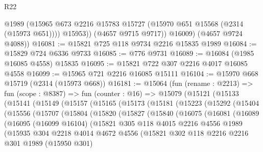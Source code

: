\begin{lexlean}{R22}
\begin{coremodule}
              @1989
              (@15965 @673 @2216 @15783 @15727 (@15970 @651 @15568 (@2314 (@15973 @651))))
              @15953))
          (@4657 @9715 @9717))
        @16009)
      (@4657 @9724 @4088))
@16081 := @15821 @725 @118 @9734 @2216 @15835 @1989
@16084 := @15829 @724 @6336 @9733
@16085 := @776 @9731
@16089 := @16084 (@1985 @16085 @4558) @15835
@16095 := @15821 @722 @307 @2216 @4017 @16085 @4558
@16099 := @15965 @721 @2216 @16085 @15111
@16104 := @15970 @668 @15719 (@2314 (@15973 @668))
@16181 := @15064
    (fun (rename : @2213) =>
    fun (scope : @8387) =>
    fun (counter : @16) =>
    @15079
      (@15121
        (@15133
          (@15141
            (@15149
              (@15157
                (@15165
                  (@15173
                    (@15181
                      (@15223
                        (@15292
                          (@15404
                            (@15556
                              (@15707
                                (@15804
                                  (@15820
                                    (@15827
                                      (@15840
                                        (@16075
                                          (@16081
                                            (@16089
                                              (@16095
                                                (@16099 @16104)
                                                (@15821
                                                  @305
                                                  @118
                                                  @4015
                                                  @2216
                                                  @4556
                                                  @1989
                                                  (@15935
                                                    @304
                                                    @2218
                                                    @4014
                                                    @4672
                                                    @4556
                                                    (@15821
                                                      @302
                                                      @118
                                                      @2216
                                                      @2216
                                                      @301
                                                      @1989
                                                      (@15950 @301)

\end{coremodule}
\end{lexlean}
